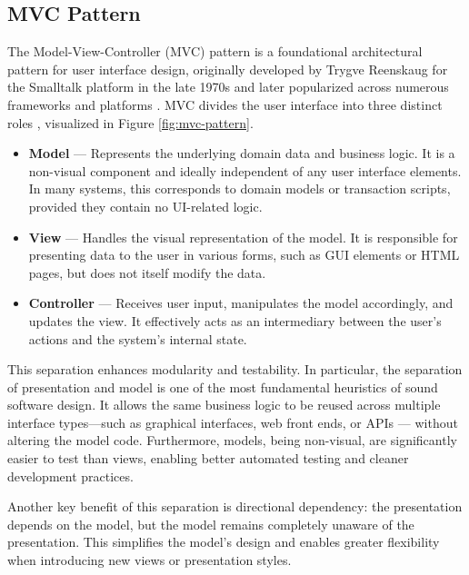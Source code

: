 \documentclass[
  digital,     %
  oneside,     %
  nosansbold,  %
  nocolorbold, %
  lof,         %
  lot,         %
]{fithesis4}
\begin{document}
\subsection{MVC Pattern}

The Model-View-Controller (\gls{MVC}) pattern is a foundational architectural pattern for user interface design, originally developed by Trygve Reenskaug for the Smalltalk platform in the late 1970s and later popularized across numerous frameworks and platforms \cite{fowlerPEAA}. \gls{MVC} divides the user interface into three distinct roles \cite{mdnMVC}, visualized in Figure \ref{fig:mvc-pattern}. 

\noindent
\begin{itemize}
    \item \textbf{Model} --- Represents the underlying domain data and business logic. It is a non-visual component and ideally independent of any user interface elements. In many systems, this corresponds to domain models or transaction scripts, provided they contain no \gls{UI}-related logic.
    \item \textbf{View} --- Handles the visual representation of the model. It is responsible for presenting data to the user in various forms, such as \gls{GUI} elements or \gls{HTML} pages, but does not itself modify the data.
    \item \textbf{Controller} --- Receives user input, manipulates the model accordingly, and updates the view. It effectively acts as an intermediary between the user's actions and the system's internal state.
\end{itemize}

This separation enhances modularity and testability. In particular, the separation of presentation and model is one of the most fundamental heuristics of sound software design. It allows the same business logic to be reused across multiple interface types—such as graphical interfaces, web front ends, or \acrshort{API}s --- without altering the model code. Furthermore, models, being non-visual, are significantly easier to test than views, enabling better automated testing and cleaner development practices.

Another key benefit of this separation is directional dependency: the presentation depends on the model, but the model remains completely unaware of the presentation. This simplifies the model’s design and enables greater flexibility when introducing new views or presentation styles.
\end{document}
